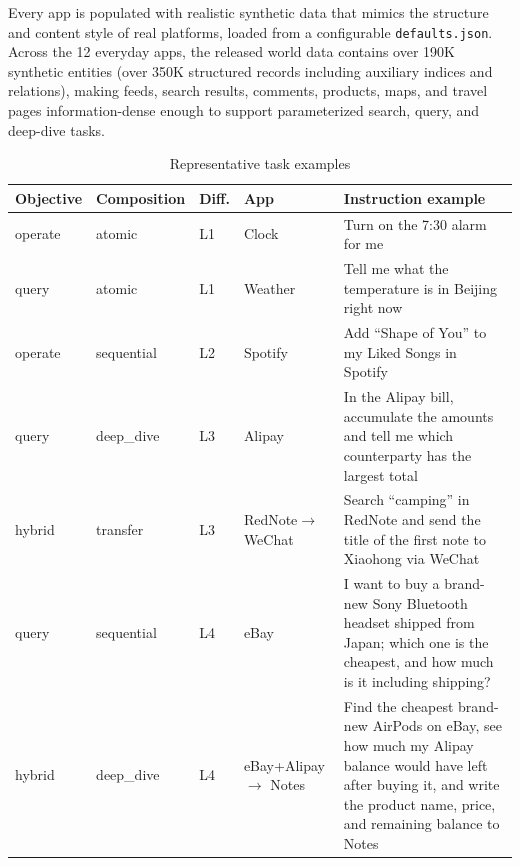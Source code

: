 \documentclass{llmxive}
\begin{document}
Every app is populated with realistic synthetic data that mimics the structure and content style of real platforms, loaded from a configurable \texttt{defaults.json}. Across the 12 everyday apps, the released world data contains over 190K synthetic entities (over 350K structured records including auxiliary indices and relations), making feeds, search results, comments, products, maps, and travel pages information-dense enough to support parameterized search, query, and deep-dive tasks.

\begin{table}[!t]
  \centering\small
  \begin{tabular}{p{1.4cm}p{1.7cm}p{0.6cm}p{2.2cm}p{7.2cm}}
    \toprule
    \textbf{Objective} & \textbf{Composition} & \textbf{Diff.} & \textbf{App} & \textbf{Instruction example} \\
    \midrule
    operate & atomic     & L1 & Clock                & Turn on the 7:30 alarm for me \\
    query   & atomic     & L1 & Weather              & Tell me what the temperature is in Beijing right now \\
    operate & sequential & L2 & Spotify              & Add ``Shape of You'' to my Liked Songs in Spotify \\
    query   & deep\_dive & L3 & Alipay               & In the Alipay bill, accumulate the amounts and tell me which counterparty has the largest total \\
    hybrid  & transfer   & L3 & RedNote\newline $\to$ WeChat & Search ``camping'' in RedNote and send the title of the first note to Xiaohong via WeChat \\
    query   & sequential & L4 & eBay                 & I want to buy a brand-new Sony Bluetooth headset shipped from Japan; which one is the cheapest, and how much is it including shipping? \\
    hybrid  & deep\_dive & L4 & eBay+Alipay\newline $\to$ Notes & Find the cheapest brand-new AirPods on eBay, see how much my Alipay balance would have left after buying it, and write the product name, price, and remaining balance to Notes \\
    \bottomrule
  \end{tabular}
  \caption{Representative task examples}
  \label{tab:task-examples}
\end{table}


\end{document}
